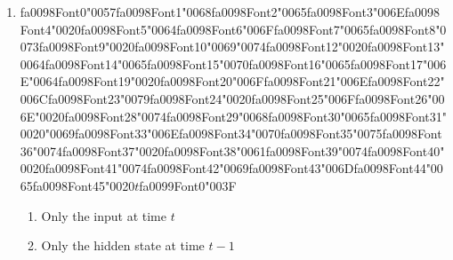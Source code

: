 \documentclass[12pt]{article}
\begin{document}
\begin{enumerate}[label=Q\arabic*.]
\begin{enumerate}[label=(\Alph*)]
    \item The next word given the predicted history
    \item The next word given the ground-truth history
    \item The current word given itself
    \item All words simultaneously
\end{enumerate}
\item {\csname fa0098Font0\endcsname\char"0057}{\csname fa0098Font1\endcsname\char"0068}{\csname fa0098Font2\endcsname\char"0065}{\csname fa0098Font3\endcsname\char"006E}{\csname fa0098Font4\endcsname\char"0020}{\csname fa0098Font5\endcsname\char"0064}{\csname fa0098Font6\endcsname\char"006F}{\csname fa0098Font7\endcsname\char"0065}{\csname fa0098Font8\endcsname\char"0073}{\csname fa0098Font9\endcsname\char"0020}{\csname fa0098Font10\endcsname\char"0069}{\char"0074}{\csname fa0098Font12\endcsname\char"0020}{\csname fa0098Font13\endcsname\char"0064}{\csname fa0098Font14\endcsname\char"0065}{\csname fa0098Font15\endcsname\char"0070}{\csname fa0098Font16\endcsname\char"0065}{\csname fa0098Font17\endcsname\char"006E}{\char"0064}{\csname fa0098Font19\endcsname\char"0020}{\csname fa0098Font20\endcsname\char"006F}{\csname fa0098Font21\endcsname\char"006E}{\csname fa0098Font22\endcsname\char"006C}{\csname fa0098Font23\endcsname\char"0079}{\csname fa0098Font24\endcsname\char"0020}{\csname fa0098Font25\endcsname\char"006F}{\csname fa0098Font26\endcsname\char"006E}{\char"0020}{\csname fa0098Font28\endcsname\char"0074}{\csname fa0098Font29\endcsname\char"0068}{\csname fa0098Font30\endcsname\char"0065}{\csname fa0098Font31\endcsname\char"0020}{\char"0069}{\csname fa0098Font33\endcsname\char"006E}{\csname fa0098Font34\endcsname\char"0070}{\csname fa0098Font35\endcsname\char"0075}{\csname fa0098Font36\endcsname\char"0074}{\csname fa0098Font37\endcsname\char"0020}{\csname fa0098Font38\endcsname\char"0061}{\csname fa0098Font39\endcsname\char"0074}{\csname fa0098Font40\endcsname\char"0020}{\csname fa0098Font41\endcsname\char"0074}{\csname fa0098Font42\endcsname\char"0069}{\csname fa0098Font43\endcsname\char"006D}{\csname fa0098Font44\endcsname\char"0065}{\csname fa0098Font45\endcsname\char"0020}$t${\csname fa0099Font0\endcsname\char"003F}
\begin{enumerate}[label=(\Alph*)]
    \item Only the input at time $t$
    \item Only the hidden state at time $t-1$

\end{enumerate}
\end{enumerate}
\end{document}
